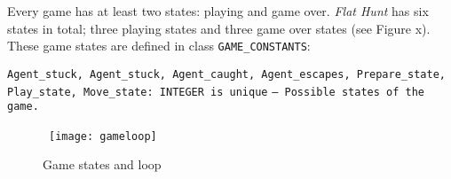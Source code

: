 Every game has at least two states: playing and game over. \emph{Flat Hunt} has six states in total; three playing states and three game over states (see Figure x). These game states are defined in class \texttt{GAME\_CONSTANTS}:

\texttt{Agent\_stuck, Agent\_stuck, Agent\_caught, Agent\_escapes, Prepare\_state, Play\_state, Move\_state: INTEGER is unique}
\texttt{-- Possible states of the game.}
\begin{figure}[h]
  \centerline{\hbox{
    \texttt{[image: gameloop]}
  }}
\caption{Game states and loop}
\label{gameloop}
\end{figure}

